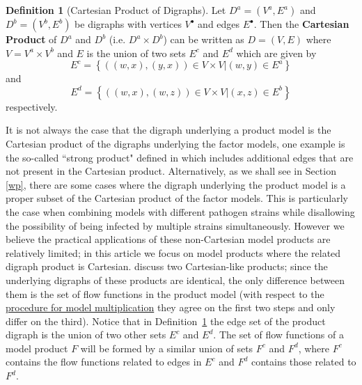\documentclass{article}
\theoremstyle{definition}
\newtheorem{definition}{Definition}
\begin{document}
\begin{definition}[Cartesian Product of Digraphs]\label{cpd}
    Let $D^a = (V^a, E^a)$ and $D^b = (V^b, E^b)$ be digraphs with vertices $V^{\bullet}$ and edges $E^{\bullet}$. Then the \textbf{Cartesian Product} of $D^a$ and $D^b$ (i.e. $D^a\times D^b$) can be written as $D=(V, E)$ where $V=V^a\times V^b$ and $E$ is the union of two sets $E^c$ and $E^d$ which are given by
    \begin{equation}
        E^c = \left\{((w,x),(y,x))\in V\times V \vert (w,y)\in E^a\right\}
    \end{equation}
    and
    \begin{equation}
        E^d = \left\{((w,x),(w,z))\in V\times V \vert (x,z)\in E^b \right\}
    \end{equation}
    respectively.
\end{definition}

It is not always the case that the digraph underlying a product model is the Cartesian product of the digraphs underlying the factor models, one example is the so-called “strong product" defined in \cite{worden2017products} which includes additional edges that are not present in the Cartesian product. Alternatively, as we shall see in Section \ref{wp}, there are some cases where the digraph underlying the product model is a proper subset of the Cartesian product of the factor models. This is particularly the case when combining models with different pathogen strains while disallowing the possibility of being infected by multiple strains simultaneously. However we believe the practical applications of these non-Cartesian model products are relatively limited; in this article we focus on model products where the related digraph product is Cartesian. \cite{worden2017products} discuss two Cartesian-like products; since the underlying digraphs of these products are identical, the only difference between them is the set of flow functions in the product model (with respect to the \hyperref[genproc]{procedure for model
  multiplication} they agree on the first two steps and only differ on the third). Notice that in Definition~\ref{cpd} the edge set of the product digraph is the union of two other sets $E^c$ and $E^d$. The set of flow functions of a model product $F$ will be formed by a similar union of sets $F^c$ and $F^d$, where $F^c$ contains the flow functions related to edges in $E^c$ and $F^d$ contains those related to $F^d$.
\end{document}
